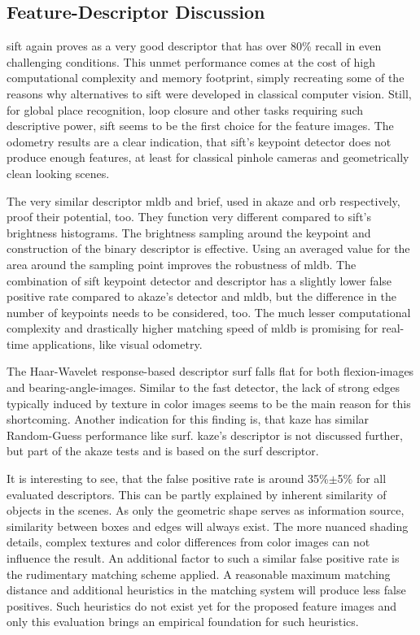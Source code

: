 \subsection{Feature-Descriptor Discussion}

\acrshort{sift} again proves as a very good descriptor that has over 80\% recall in even challenging conditions.
This unmet performance comes at the cost of high computational complexity and memory footprint, simply recreating some of the reasons why alternatives to \acrshort{sift} were developed in classical computer vision.
Still, for global place recognition, loop closure and other tasks requiring such descriptive power, \acrshort{sift} seems to be the first choice for the feature images.
The odometry results are a clear indication, that \acrshort{sift}'s keypoint detector does not produce enough features, at least for classical pinhole cameras and geometrically clean looking scenes.

The very similar descriptor \acrshort{mldb} and \acrshort{brief}, used in \acrshort{akaze} and \acrshort{orb} respectively, proof their potential, too.
They function very different compared to \acrshort{sift}'s brightness histograms.
The brightness sampling around the keypoint and construction of the binary descriptor is effective.
Using an averaged value for the area around the sampling point improves the robustness of \acrshort{mldb}.
The combination of \acrshort{sift} keypoint detector and descriptor has a slightly lower false positive rate compared to \acrshort{akaze}'s detector and \acrshort{mldb}, but the difference in the number of keypoints needs to be considered, too.
The much lesser computational complexity and drastically higher matching speed of \acrshort{mldb} is promising for real-time applications, like visual odometry.

The Haar-Wavelet response-based descriptor \acrshort{surf} falls flat for both \glspl{flexion-image} and \glspl{bearing-angle-image}.
Similar to the \acrshort{fast} detector, the lack of strong edges typically induced by texture in color images seems to be the main reason for this shortcoming.
Another indication for this finding is, that \acrshort{kaze} has similar Random-Guess performance like \acrshort{surf}.
\acrshort{kaze}'s descriptor is not discussed further, but part of the \acrshort{akaze} tests and is based on the \acrshort{surf} descriptor.

It is interesting to see, that the false positive rate is around 35\%$\pm$5\% for all evaluated descriptors.
This can be partly explained by inherent similarity of objects in the scenes.
As only the geometric shape serves as information source, similarity between boxes and edges will always exist.
The more nuanced shading details, complex textures and color differences from color images can not influence the result.
An additional factor to such a similar false positive rate is the rudimentary matching scheme applied.
A reasonable maximum matching distance and additional heuristics in the matching system will produce less false positives.
Such heuristics do not exist yet for the proposed feature images and only this evaluation brings an empirical foundation for such heuristics.
